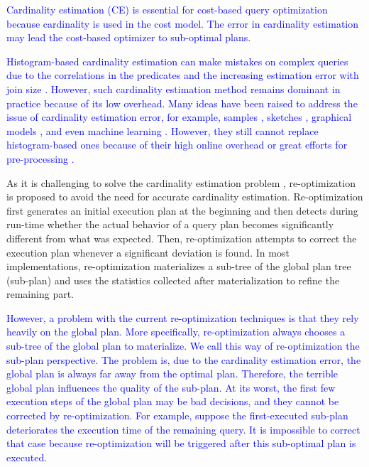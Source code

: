 \textcolor{blue}{
    Cardinality estimation (CE) is essential for cost-based query optimization because cardinality is used in the cost model. The error in cardinality estimation may lead the cost-based optimizer to sub-optimal plans.
}\par
\textcolor{blue}{
    Histogram-based cardinality estimation can make mistakes on complex queries due to the correlations in the predicates and the increasing estimation error with join size \cite{paper31}. However, such cardinality estimation method remains dominant in practice because of its low overhead. Many ideas have been raised to address the issue of cardinality estimation error, for example, samples \cite{paper19, paper22, paper23}, sketches \cite{paper55, PessimisticCE}, graphical models \cite{paper5}, and even machine learning \cite{MLCE}. However, they still cannot replace histogram-based ones because of their high online overhead or great efforts for pre-processing \cite{SampleReopt}.
}\par
    As it is challenging to solve the cardinality estimation problem \cite{MichaelStonebraker}, re-optimization \cite{Reopt, Pop, MichaelStonebraker, SampleReopt, QIE} is proposed to avoid the need for accurate cardinality estimation. Re-optimization first generates an initial execution plan at the beginning and then detects during run-time whether the actual behavior of a query plan becomes significantly different from what was expected. Then, re-optimization attempts to correct the execution plan whenever a significant deviation is found. In most implementations, re-optimization materializes a sub-tree of the global plan tree (sub-plan) and uses the statistics collected after materialization to refine the remaining part.\par
\textcolor{blue}{
    However, a problem with the current re-optimization techniques is that they rely heavily on the global plan. More specifically, re-optimization always chooses a sub-tree of the global plan to materialize. We call this way of re-optimization the sub-plan perspective. The problem is, due to the cardinality estimation error, the global plan is always far away from the optimal plan. Therefore, the terrible global plan influences the quality of the sub-plan. At its worst, the first few execution steps of the global plan may be bad decisions, and they cannot be corrected by re-optimization. For example, suppose the first-executed sub-plan deteriorates the execution time of the remaining query. It is impossible to correct that case because re-optimization will be triggered after this sub-optimal plan is executed.
}\par
